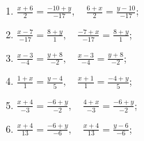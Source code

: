 	\vspace{10pt}
	\begin{enumerate}
		\setcounter{enumi}{\value{tasks}}

			\item \( \displaystyle \frac{x+6}{2} = \frac{-10+y}{-17}, \quad \frac{6+x}{2} = \frac{y-10}{-17} \);
			\item \( \displaystyle \frac{x-7}{-17} = \frac{8+y}{1}, \quad \frac{-7+x}{-17} = \frac{8+y}{1} \);
			\item \( \displaystyle \frac{x-3}{-4} = \frac{y+8}{-2}, \quad \frac{x-3}{-4} = \frac{y+8}{-2} \);
			\item \( \displaystyle \frac{1+x}{1} = \frac{y-4}{5}, \quad \frac{x+1}{1} = \frac{-4+y}{5} \);
			\item \( \displaystyle \frac{x+4}{-3} = \frac{-6+y}{-2}, \quad \frac{4+x}{-3} = \frac{-6+y}{-2} \);
			\item \( \displaystyle \frac{x+4}{13} = \frac{-6+y}{-6}, \quad \frac{x+4}{13} = \frac{y-6}{-6} \);

		\setcounter{tasks}{\value{enumi}}
	\end{enumerate}

